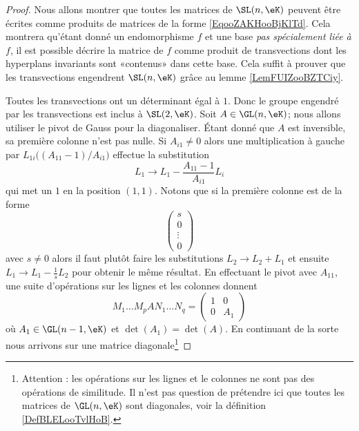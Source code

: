 \begin{proof}
    Nous allons montrer que toutes les matrices de \( \SL(n,\eK)\) peuvent être écrites comme produits de matrices de la forme \eqref{EqooZAKHooBjKlTd}. Cela montrera qu'étant donné un endomorphisme \( f\) et une base \emph{pas spécialement liée à \( f\)}, il est possible décrire la matrice de \( f\) comme produit de transvections dont les hyperplans invariants sont «contenus» dans cette base. Cela suffit à prouver que les transvections engendrent \( \SL(n,\eK)\) grâce au lemme \ref{LemFUIZooBZTCiy}.

    Toutes les transvections ont un déterminant égal à \( 1\). Donc le groupe engendré par les transvections est inclus à \( \SL(2,\eK)\). Soit \( A\in\GL(n,\eK)\); nous allons utiliser le pivot de Gauss pour la diagonaliser. Étant donné que \( A\) est inversible, sa première colonne n'est pas nulle. Si \( A_{i1}\neq 0\) alors une multiplication à gauche par \( L_{1i}\big(   (A_{11}-1)/A_{i1}  \big)\) effectue la substitution
    \begin{equation}
        L_1\to L_1-\frac{ A_{11}-1 }{ A_{i1} }L_i
    \end{equation}
    qui met un \( 1\) en la position \( (1,1)\). Notons que si la première colonne est de la forme 
    \begin{equation}
        \begin{pmatrix}
            s    \\ 
            0    \\ 
            \vdots    \\ 
            0    
        \end{pmatrix}
    \end{equation}
    avec \( s\neq 0\) alors il faut plutôt faire les substitutions \( L_2\to L_2+L_1\) et ensuite \( L_1\to L_1-\frac{1}{ s }L_2\) pour obtenir le même résultat. En effectuant le pivot avec \( A_{11}\), une suite d'opérations sur les lignes et les colonnes donnent
    \begin{equation}
        M_1\ldots M_pAN_1\ldots N_q=\begin{pmatrix}
            1    &   0    \\ 
            0    &   A_1    
        \end{pmatrix}
    \end{equation}
    où \( A_1\in\GL(n-1,\eK)\) et \( \det(A_1)=\det(A)\). En continuant de la sorte nous arrivons sur une matrice diagonale\footnote{Attention : les opérations sur les lignes et le colonnes ne sont pas des opérations de similitude. Il n'est pas question de prétendre ici que toutes les matrices de \( \GL(n,\eK)\) sont diagonales, voir la définition \ref{DefBLELooTvlHoB}.}

\end{proof}
